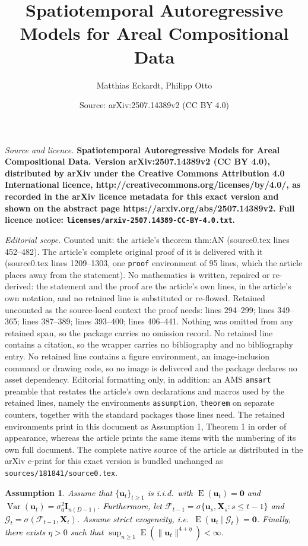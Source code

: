 \documentclass[10pt,a4paper]{amsart}
\title{\LARGE \bf Spatiotemporal Autoregressive Models for Areal Compositional Data}
\author{Matthias Eckardt, Philipp Otto}
\date{Source: arXiv:2507.14389v2 (CC BY 4.0)}
\newtheorem{assumption}{Assumption}
\DeclareMathOperator{\E}{E}
\DeclareMathOperator{\Var}{Var}
\newcommand{\xmat}{\mathbf}
\newcommand{\xvec}{\boldsymbol}
\begin{document}
\maketitle

\noindent\emph{Source and licence.} \LARGE \bf Spatiotemporal Autoregressive Models for Areal Compositional Data. Version arXiv:2507.14389v2 (CC BY 4.0), distributed by arXiv under the Creative Commons Attribution 4.0 International licence, http://creativecommons.org/licenses/by/4.0/, as recorded in the arXiv licence metadata for this exact version and shown on the abstract page https://arxiv.org/abs/2507.14389v2. Full licence notice: \texttt{licenses/arxiv-2507.14389-CC-BY-4.0.txt}.\par\smallskip

\noindent\textit{Editorial scope.} Counted unit: the article's theorem thm:AN (source0.tex lines 452--482). The article's complete original proof of it is delivered with it (source0.tex lines 1209--1303, one \texttt{proof} environment of 95 lines, which the article places away from the statement). No mathematics is written, repaired or re-derived: the statement and the proof are the article's own lines, in the article's own notation, and no retained line is substituted or re-flowed.  Retained uncounted as the source-local context the proof needs: lines 294--299; lines 349--365; lines 387--389; lines 393--400; lines 406--441.  Nothing was omitted from any retained span, so the package carries no omission record.  No retained line contains a citation, so the wrapper carries no bibliography and no bibliography entry.  No retained line contains a figure environment, an image-inclusion command or drawing code, so no image is delivered and the package declares no asset dependency.  Editorial formatting only, in addition: an AMS \texttt{amsart} preamble that restates the article's own declarations and macros used by the retained lines, namely the environments \texttt{assumption}, \texttt{theorem} on separate counters, together with the standard packages those lines need.  The retained environments print in this document as Assumption 1, Theorem 1 in order of appearance, whereas the article prints the same items with the numbering of its own full document.  The complete native source of the article as distributed in the arXiv e-print for this exact version is bundled unchanged as \texttt{sources/181841/source0.tex}.
\begin{assumption}\label{ass:err_exo_cons}
\textcolor{black}{Assume that $\{\xvec{u}_t\}_{t\ge1}$ is i.i.d.\ with $\E(\xvec{u}_t)=\xvec{0}$ and $\Var(\xvec{u}_t)=\sigma_0^2 \xmat{I}_{n(D-1)}$. Furthermore, let $\mathcal{F}_{t-1}=\sigma\{\xvec{u}_s,\xmat{X}_s: s\le t-1\}$ and
$\mathcal{G}_t=\sigma(\mathcal{F}_{t-1},\xmat{X}_t)$. Assume strict exogeneity, i.e.\
$\E(\xvec{u}_t\mid \mathcal{G}_t)=\xvec{0}$.
Finally, there exists $\eta > 0$ such that $\sup_{n \geq 1}\E\!\left(\|\xvec{u}_t\|^{4+\eta}\right) < \infty.$}
\end{assumption}
\end{document}
